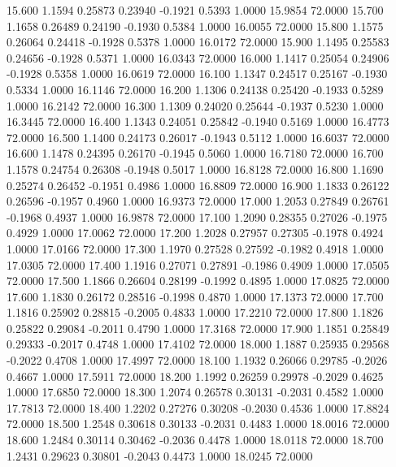   15.600   1.1594   0.25873   0.23940  -0.1921   0.5393   1.0000  15.9854  72.0000
  15.700   1.1658   0.26489   0.24190  -0.1930   0.5384   1.0000  16.0055  72.0000
  15.800   1.1575   0.26064   0.24418  -0.1928   0.5378   1.0000  16.0172  72.0000
  15.900   1.1495   0.25583   0.24656  -0.1928   0.5371   1.0000  16.0343  72.0000
  16.000   1.1417   0.25054   0.24906  -0.1928   0.5358   1.0000  16.0619  72.0000
  16.100   1.1347   0.24517   0.25167  -0.1930   0.5334   1.0000  16.1146  72.0000
  16.200   1.1306   0.24138   0.25420  -0.1933   0.5289   1.0000  16.2142  72.0000
  16.300   1.1309   0.24020   0.25644  -0.1937   0.5230   1.0000  16.3445  72.0000
  16.400   1.1343   0.24051   0.25842  -0.1940   0.5169   1.0000  16.4773  72.0000
  16.500   1.1400   0.24173   0.26017  -0.1943   0.5112   1.0000  16.6037  72.0000
  16.600   1.1478   0.24395   0.26170  -0.1945   0.5060   1.0000  16.7180  72.0000
  16.700   1.1578   0.24754   0.26308  -0.1948   0.5017   1.0000  16.8128  72.0000
  16.800   1.1690   0.25274   0.26452  -0.1951   0.4986   1.0000  16.8809  72.0000
  16.900   1.1833   0.26122   0.26596  -0.1957   0.4960   1.0000  16.9373  72.0000
  17.000   1.2053   0.27849   0.26761  -0.1968   0.4937   1.0000  16.9878  72.0000
  17.100   1.2090   0.28355   0.27026  -0.1975   0.4929   1.0000  17.0062  72.0000
  17.200   1.2028   0.27957   0.27305  -0.1978   0.4924   1.0000  17.0166  72.0000
  17.300   1.1970   0.27528   0.27592  -0.1982   0.4918   1.0000  17.0305  72.0000
  17.400   1.1916   0.27071   0.27891  -0.1986   0.4909   1.0000  17.0505  72.0000
  17.500   1.1866   0.26604   0.28199  -0.1992   0.4895   1.0000  17.0825  72.0000
  17.600   1.1830   0.26172   0.28516  -0.1998   0.4870   1.0000  17.1373  72.0000
  17.700   1.1816   0.25902   0.28815  -0.2005   0.4833   1.0000  17.2210  72.0000
  17.800   1.1826   0.25822   0.29084  -0.2011   0.4790   1.0000  17.3168  72.0000
  17.900   1.1851   0.25849   0.29333  -0.2017   0.4748   1.0000  17.4102  72.0000
  18.000   1.1887   0.25935   0.29568  -0.2022   0.4708   1.0000  17.4997  72.0000
  18.100   1.1932   0.26066   0.29785  -0.2026   0.4667   1.0000  17.5911  72.0000
  18.200   1.1992   0.26259   0.29978  -0.2029   0.4625   1.0000  17.6850  72.0000
  18.300   1.2074   0.26578   0.30131  -0.2031   0.4582   1.0000  17.7813  72.0000
  18.400   1.2202   0.27276   0.30208  -0.2030   0.4536   1.0000  17.8824  72.0000
  18.500   1.2548   0.30618   0.30133  -0.2031   0.4483   1.0000  18.0016  72.0000
  18.600   1.2484   0.30114   0.30462  -0.2036   0.4478   1.0000  18.0118  72.0000
  18.700   1.2431   0.29623   0.30801  -0.2043   0.4473   1.0000  18.0245  72.0000
